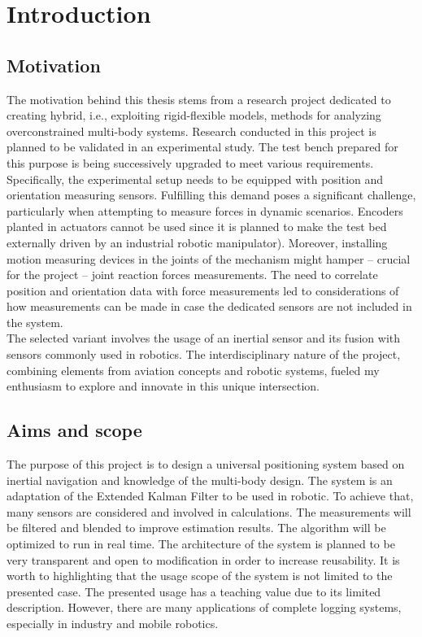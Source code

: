 \chapter{Introduction}

\section{Motivation}

The motivation behind this thesis stems from a research project dedicated to creating hybrid, i.e., exploiting rigid-flexible models, methods for analyzing overconstrained multi-body systems. Research conducted in this project is planned to be validated in an experimental study. The test bench prepared for this purpose is being successively upgraded to meet various requirements. Specifically, the experimental setup needs to be equipped with position and orientation measuring sensors. Fulfilling this demand poses a significant challenge, particularly when attempting to measure forces in dynamic scenarios. Encoders planted in actuators cannot be used since it is planned to make the test bed externally driven by an industrial robotic manipulator). Moreover, installing motion measuring devices in the joints of the mechanism might hamper -- crucial for the project -- joint reaction forces measurements. The need to correlate position and orientation data with force measurements led to considerations of how measurements can be made in case the dedicated sensors are not included in the system.\\

The selected variant involves the usage of an inertial sensor and its fusion with sensors commonly used in robotics. The interdisciplinary nature of the project, combining elements from aviation concepts and robotic systems, fueled my enthusiasm to explore and innovate in this unique intersection.

\section{Aims and scope}

The purpose of this project is to design a universal positioning system based on inertial navigation and knowledge of the multi-body design. The system is an adaptation of the Extended Kalman Filter to be used in robotic. To achieve that, many sensors are considered and involved in calculations. The measurements will be filtered and blended to improve estimation results. The algorithm will be optimized to run in real time. The architecture of the system is planned to be very transparent and open to modification in order to increase reusability. It is worth to highlighting that the usage scope of the system is not limited to the presented case. The presented usage has a teaching value due to its limited description. However, there are many applications of complete logging systems, especially in industry and mobile robotics.\\

